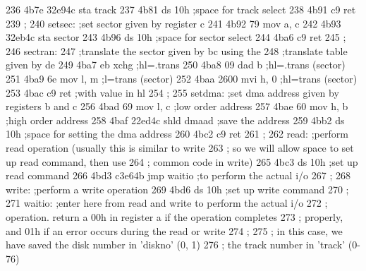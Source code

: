 236      4b7e 32e94c               sta    track
237      4b81                      ds     10h            ;space for track select
238      4b91 c9                   ret
239                       ;
240                       setsec:  ;set sector given by register c
241      4b92 79                   mov    a, c
242      4b93 32eb4c               sta    sector
243      4b96                      ds     10h            ;space for sector select
244      4ba6 c9                   ret
245                       ;
246                       sectran:
247                                ;translate the sector given by bc using the
248                                ;translate table given by de
249      4ba7 eb                   xchg                  ;hl=.trans
250      4ba8 09                   dad    b              ;hl=.trans (sector)
251      4ba9 6e                   mov    l, m           ;l=trans (sector)
252      4baa 2600                 mvi    h, 0           ;hl=trans (sector)
253      4bac c9                   ret                   ;with value in hl
254                       ;
255                       setdma:  ;set dma address given by registers b and c
256      4bad 69                   mov    l, c           ;low order address
257      4bae 60                   mov    h, b           ;high order address
258      4baf 22ed4c               shld   dmaad          ;save the address
259      4bb2                      ds     10h            ;space for setting the dma address
260      4bc2 c9                   ret
261                       ;
262                       read:    ;perform read operation (usually this is similar to write
263                       ;        so we will allow space to set up read command, then use
264                       ;        common code in write)
265      4bc3                      ds     10h            ;set up read command
266      4bd3 c3e64b               jmp    waitio         ;to perform the actual i/o
267                       ;
268                       write:   ;perform a write operation
269      4bd6                      ds     10h            ;set up write command
270                       ;
271                       waitio:  ;enter here from read and write to perform the actual i/o
272                       ;        operation. return a 00h in register a if the operation completes
273                       ;        properly, and 01h if an error occurs during the read or write
274                       ;
275                       ;        in this case, we have saved the disk number in 'diskno' (0, 1)
276                       ;                              the track number in 'track' (0-76)

